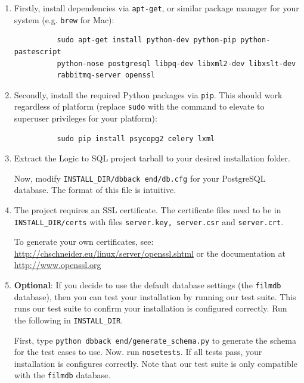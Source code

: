 \documentclass[a4paper, 11pt]{article}
\begin{document}
    \begin{enumerate}
      \item Firstly, install dependencies via \texttt{apt-get}, or similar
        package manager for your system (e.g. \texttt{brew} for Mac):
        \begin{verbatim}
          sudo apt-get install python-dev python-pip python-pastescript
          python-nose postgresql libpq-dev libxml2-dev libxslt-dev
          rabbitmq-server openssl
        \end{verbatim}

      \item Secondly, install the required Python packages via \texttt{pip}.
        This should work regardless of platform (replace \texttt{sudo} with the
        command to elevate to superuser privileges for your platform):
        \begin{verbatim}
          sudo pip install psycopg2 celery lxml
        \end{verbatim}

      \item Extract the Logic to SQL project tarball to your desired
        installation folder.

        Now, modify \texttt{INSTALL\_DIR/dbback end/db.cfg} for your PostgreSQL
        database. The format of this file is intuitive.

      \item The project requires an SSL certificate. The certificate
        files need to be in \texttt{INSTALL\_DIR/certs} with files
        \texttt{server.key, server.csr} and \texttt{server.crt}.

        To generate your own certificates, see:\\
        \url{http://chschneider.eu/linux/server/openssl.shtml} or the
        documentation at \url{http://www.openssl.org}

      \item \textbf{Optional}: If you decide to use
        the default database settings (the \texttt{filmdb} database), then you
        can test your installation by running our test suite. This runs
        our test suite to confirm your installation is configured correctly.
        Run the following in \texttt{INSTALL\_DIR}.

        First, type \texttt{python dbback end/generate\_schema.py} to generate
        the schema for the test cases to use. Now. run \texttt{nosetests}. If
        all tests pass, your installation is configures correctly. Note that
        our test suite is only compatible with the \texttt{filmdb} database.


\end{enumerate}
\end{document}
